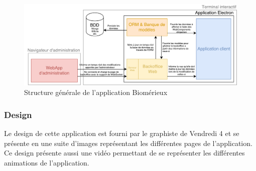 \documentclass{article}
\begin{document}
\begin{landscape}
    \begin{figure}[h]
        \centering
        \includegraphics[scale=0.9]{Proposition-utopia.pdf}
        \caption{Structure générale de l'application Biomérieux}
    \end{figure}
\end{landscape}

\clearpage

\subsubsection{Design}

Le design de cette application est fourni par le graphiste de Vendredi 4 et se présente en une suite d'images représentant les différentes pages de l'application.
Ce design présente aussi une vidéo permettant de se représenter les différentes animations de l'application.
\end{document}

